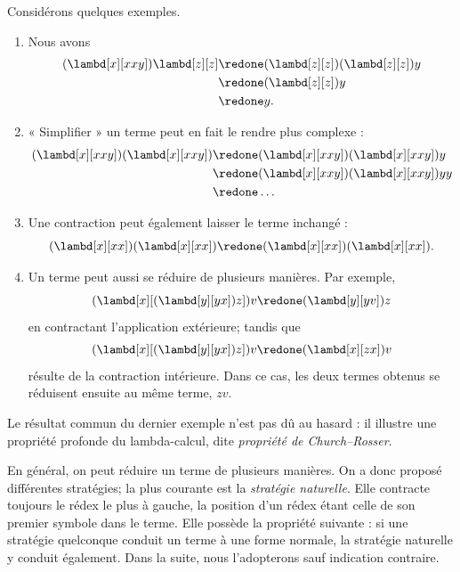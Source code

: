 \documentclass[../../../include/open-logic-section]{subfiles}
\begin{document}
Considérons quelques exemples.
\begin{enumerate}
\item Nous avons
\begin{align*}
(\lambd[x][xxy]) \lambd[z][z]
  & \redone (\lambd[z][z])(\lambd[z][z]) y \\
  & \redone (\lambd[z][z]) y \\
  & \redone y.
\end{align*}
\item « Simplifier » un terme peut en fait
  le rendre plus complexe :
\begin{align*}
(\lambd[x][xxy])(\lambd[x][xxy])
  & \redone (\lambd[x][xxy])(\lambd[x][xxy])y \\
  & \redone (\lambd[x][xxy])(\lambd[x][xxy])yy \\
  & \redone \dots
\end{align*}
\item Une contraction peut également laisser
  le terme inchangé :
\[
(\lambd[x][xx])(\lambd[x][xx])
\redone (\lambd[x][xx])(\lambd[x][xx]).
\]
\item Un terme peut aussi se réduire de
  plusieurs manières. Par exemple,
\[
(\lambd[x][(\lambd[y][yx]) z]) v
\redone (\lambd[y][yv]) z
\]
  en contractant l'application extérieure;
  tandis que
\[
(\lambd[x][(\lambd[y][yx]) z]) v
\redone (\lambd[x][zx]) v
\]
  résulte de la contraction intérieure.
  Dans ce cas, les deux termes obtenus se
  réduisent ensuite au même terme, $zv$.
\end{enumerate}

Le résultat commun du dernier exemple n'est
pas dû au hasard : il illustre une propriété
profonde du lambda-calcul, dite
\emph{propriété de Church--Rosser}.

\begin{digress}
En général, on peut réduire un terme de
plusieurs manières. On a donc proposé
différentes stratégies; la plus courante
est la \emph{stratégie naturelle}. Elle
contracte toujours le rédex le plus à gauche,
la position d'un rédex étant celle de son
premier symbole dans le terme. Elle possède
la propriété suivante : si une stratégie
quelconque conduit un terme à une forme
normale, la stratégie naturelle y conduit
également. Dans la suite, nous l'adopterons
sauf indication contraire.
\end{digress}
\end{document}
